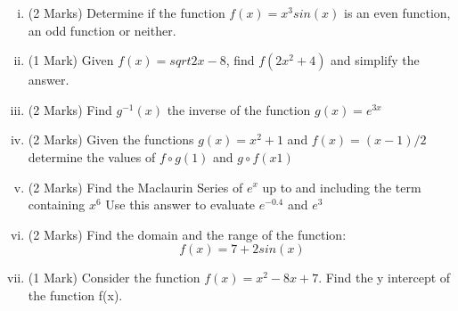 \documentclass[]{article}
\begin{document}
\newpage

\begin{enumerate}[(i)]
\item (2 Marks) Determine if the function $f(x) = x^3sin(x)$ is an even function, an odd function or neither.

\item (1 Mark) Given $f(x) = sqrt{2x-8}$, find $f(2x^2+4)$ and simplify the answer.

\item (2 Marks) Find $g^{-1} (x)$ the inverse of the function $g(x) = e^{3x}$


\item (2 Marks) Given the functions $g(x) = x^2+1$ and $f(x) = (x-1)/2$ determine the values of $f \circ g(1)$ and $g \circ f(x1)$

\item (2 Marks) Find the Maclaurin Series of $e^{x}$ up to and including the term containing $x^6$
Use this answer to evaluate $e^{-0.4}$ and $e^{3}$


\item (2 Marks) Find the domain and the range of the function:
\[f(x) = 7 + 2 sin (x)\]

\item 
(1 Mark) Consider the function $f(x) = x^2 -8x  + 7$. Find the y intercept of the function f(x). 

\end{enumerate}
\end{document}
